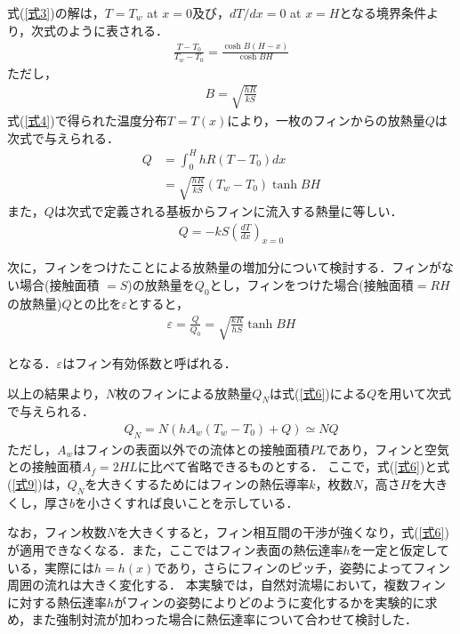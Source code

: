 \documentclass[a4paper,11pt,uplatex]{jsarticle}
\begin{document}
式(\ref{式3})の解は，$T=T_w$ at $x=0$及び，$dT/dx=0$ at $x=H$となる境界条件より，次式のように表される．
\begin{align}
  \label{式4}
  \frac{T-T_0}{T_w-T_0}=\frac{\cosh{B(H-x)}}{\cosh{BH}}
\end{align}
ただし，
\begin{align}
  B=\sqrt{\frac{hR}{kS}}
\end{align}
式(\ref{式4})で得られた温度分布$T=T(x)$により，一枚のフィンからの放熱量$Q$は次式で与えられる．
\begin{align}
  \label{式6}
  Q &= \int^H_0 hR(T-T_0)dx \\
  &= \sqrt{\frac{hR}{kS}}(T_w-T_0)\tanh{BH}
\end{align}
また，$Q$は次式で定義される基板からフィンに流入する熱量に等しい．
\begin{align}
  Q=-kS\left(\frac{dT}{dx}\right)_{x=0}
\end{align}

\par
次に，フィンをつけたことによる放熱量の増加分について検討する．フィンがない場合(接触面積 $=S$)の放熱量を$Q_0$とし，フィンをつけた場合(接触面積$=RH$の放熱量)$Q$との比を$\varepsilon$とすると，
\begin{align}
  \varepsilon = \frac{Q}{Q_0} = \sqrt{\frac{kR}{hS}}\tanh{BH}
\end{align}

となる．$\varepsilon$はフィン有効係数と呼ばれる．
\par
以上の結果より，$N$枚のフィンによる放熱量$Q_N$は式(\ref{式6})による$Q$を用いて次式で与えられる．
\begin{align}
  \label{式9}
  Q_N = N(hA_w(T_w-T_0)+Q) \simeq NQ
\end{align}
ただし，$A_w$はフィンの表面以外での流体との接触面積$PL$であり，フィンと空気との接触面積$A_f = 2HL$に比べて省略できるものとする．
ここで，式(\ref{式6})と式(\ref{式9})は，$Q_N$を大きくするためにはフィンの熱伝導率$k$，枚数$N$，高さ$H$を大きくし，厚さ$b$を小さくすれば良いことを示している．
\par
なお，フィン枚数$N$を大きくすると，フィン相互間の干渉が強くなり，式(\ref{式6})が適用できなくなる．また，ここではフィン表面の熱伝達率$h$を一定と仮定している，実際には$h=h(x)$であり，さらにフィンのピッチ，姿勢によってフィン周囲の流れは大きく変化する．
本実験では，自然対流場において，複数フィンに対する熱伝達率$h$がフィンの姿勢によりどのように変化するかを実験的に求め，また強制対流が加わった場合に熱伝達率について合わせて検討した．
\end{document}
